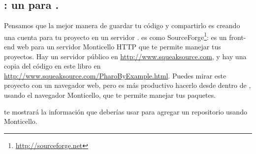 \documentclass[a4paper,10pt,twoside]{book}
\begin{document}

\subsection{\ind{\sqsrc}: un  para \pharo.} 

Pensamos que la mejor manera de guardar tu c\'odigo y compartirlo es creando una cuenta para tu proyecto en un servidor \sqsrc. \sqsrc es como SourceForge\footnote{\url{http://sourceforge.net}}: es un front-end web para un servidor Monticello HTTP que te permite manejar tus proyectos.
Hay un servidor \sqsrc p\'ublico en \url{http://www.squeaksource.com}, y hay una copia del c\'odigo en este libro en \url{http://www.squeaksource.com/PharoByExample.html}. Puedes mirar este proyecto con un navegador web, pero es m\'as productivo hacerlo desde dentro de \pharo, usando el navegador Monticello, que te permite manejar tus paquetes.


\sqsrc te mostrar\'a la informaci\'on que deber\'ias usar para agregar un repositorio usando Monticello.
\end{document}
